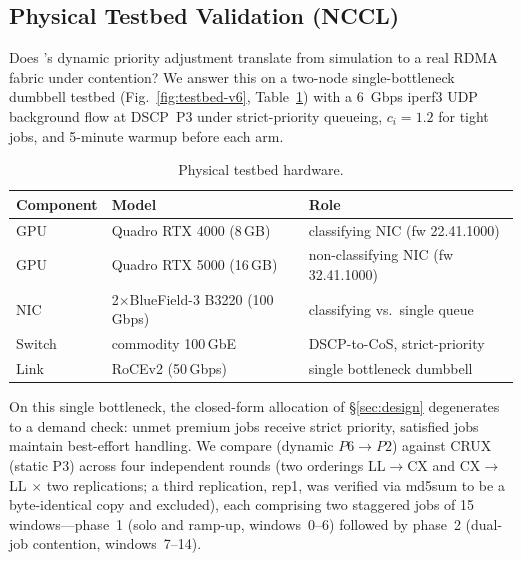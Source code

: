 \subsection{Physical Testbed Validation (NCCL)}
\label{sec:eq6}

Does \Name's dynamic priority adjustment translate from simulation to a real RDMA fabric under contention? We answer this on a two-node single-bottleneck dumbbell testbed (Fig.~\ref{fig:testbed-v6}, Table~\ref{tab:testbed-hw}) with a 6~Gbps iperf3 UDP background flow at DSCP~P3 under strict-priority queueing, $c_i=1.2$ for tight jobs, and 5-minute warmup before each arm.

\begin{table}[t]
\centering
\caption{Physical testbed hardware.}
\label{tab:testbed-hw}
\scriptsize
\setlength{\tabcolsep}{3pt}
\begin{tabular}{@{}l l p{4cm}@{}}
\toprule
\textbf{Component} & \textbf{Model} & \textbf{Role} \\
\midrule
GPU & Quadro RTX 4000 (8\,GB) & classifying NIC (fw 22.41.1000) \\
GPU& Quadro RTX 5000 (16\,GB) & non-classifying NIC (fw 32.41.1000) \\
NIC & 2$\times$BlueField-3 B3220 (100\,Gbps) & classifying vs.\ single queue \\
Switch & commodity 100\,GbE & DSCP-to-CoS, strict-priority \\
Link   & RoCEv2 (50\,Gbps) & single bottleneck dumbbell \\
\bottomrule
\end{tabular}
\end{table}

On this single bottleneck, the closed-form allocation of \S\ref{sec:design} degenerates to a demand check: unmet premium jobs receive strict priority, satisfied jobs maintain best-effort handling.
We compare \Name (dynamic $P6{\rightarrow}P2$) against CRUX (static P3) across four independent rounds (two orderings LL$\rightarrow$CX and CX$\rightarrow$LL $\times$ two replications; a third replication, rep1, was verified via md5sum to be a byte-identical copy and excluded), each comprising two staggered jobs of 15 windows---phase~1 (solo and ramp-up, windows~0--6) followed by phase~2 (dual-job contention, windows~7--14).


